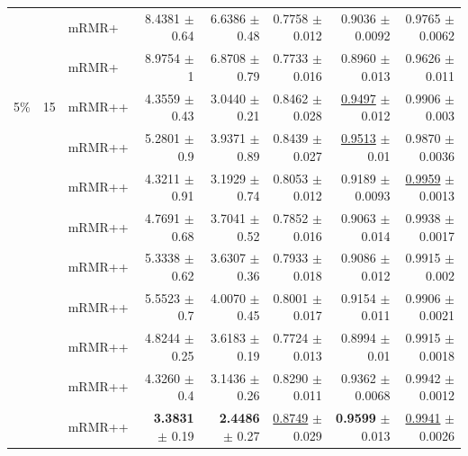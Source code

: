 \begin{longtable}{llp{}rrrrr}
 &  & mRMR+ & 8.4381 {\scriptsize $\pm$ 0.64} & 6.6386 {\scriptsize $\pm$ 0.48} & 0.7758 {\scriptsize $\pm$ 0.012} & 0.9036 {\scriptsize $\pm$ 0.0092} & 0.9765 {\scriptsize $\pm$ 0.0062} \\
 &  & mRMR+ & 8.9754 {\scriptsize $\pm$ 1} & 6.8708 {\scriptsize $\pm$ 0.79} & 0.7733 {\scriptsize $\pm$ 0.016} & 0.8960 {\scriptsize $\pm$ 0.013} & 0.9626 {\scriptsize $\pm$ 0.011} \\
\midrule
5\% & 15 & mRMR++ & 4.3559 {\scriptsize $\pm$ 0.43} & 3.0440 {\scriptsize $\pm$ 0.21} & 0.8462 {\scriptsize $\pm$ 0.028} & \underline{0.9497} {\scriptsize $\pm$ 0.012} & 0.9906 {\scriptsize $\pm$ 0.003} \\
 &  & mRMR++ & 5.2801 {\scriptsize $\pm$ 0.9} & 3.9371 {\scriptsize $\pm$ 0.89} & 0.8439 {\scriptsize $\pm$ 0.027} & \underline{0.9513} {\scriptsize $\pm$ 0.01} & 0.9870 {\scriptsize $\pm$ 0.0036} \\
 &  & mRMR++ & 4.3211 {\scriptsize $\pm$ 0.91} & 3.1929 {\scriptsize $\pm$ 0.74} & 0.8053 {\scriptsize $\pm$ 0.012} & 0.9189 {\scriptsize $\pm$ 0.0093} & \underline{0.9959} {\scriptsize $\pm$ 0.0013} \\
 &  & mRMR++ & 4.7691 {\scriptsize $\pm$ 0.68} & 3.7041 {\scriptsize $\pm$ 0.52} & 0.7852 {\scriptsize $\pm$ 0.016} & 0.9063 {\scriptsize $\pm$ 0.014} & 0.9938 {\scriptsize $\pm$ 0.0017} \\
 &  & mRMR++ & 5.3338 {\scriptsize $\pm$ 0.62} & 3.6307 {\scriptsize $\pm$ 0.36} & 0.7933 {\scriptsize $\pm$ 0.018} & 0.9086 {\scriptsize $\pm$ 0.012} & 0.9915 {\scriptsize $\pm$ 0.002} \\
 &  & mRMR++ & 5.5523 {\scriptsize $\pm$ 0.7} & 4.0070 {\scriptsize $\pm$ 0.45} & 0.8001 {\scriptsize $\pm$ 0.017} & 0.9154 {\scriptsize $\pm$ 0.011} & 0.9906 {\scriptsize $\pm$ 0.0021} \\
 &  & mRMR++ & 4.8244 {\scriptsize $\pm$ 0.25} & 3.6183 {\scriptsize $\pm$ 0.19} & 0.7724 {\scriptsize $\pm$ 0.013} & 0.8994 {\scriptsize $\pm$ 0.01} & 0.9915 {\scriptsize $\pm$ 0.0018} \\
 &  & mRMR++ & 4.3260 {\scriptsize $\pm$ 0.4} & 3.1436 {\scriptsize $\pm$ 0.26} & 0.8290 {\scriptsize $\pm$ 0.011} & 0.9362 {\scriptsize $\pm$ 0.0068} & 0.9942 {\scriptsize $\pm$ 0.0012} \\
 &  & mRMR++ & \textbf{3.3831} {\scriptsize $\pm$ 0.19} & \textbf{2.4486} {\scriptsize $\pm$ 0.27} & \underline{0.8749} {\scriptsize $\pm$ 0.029} & \textbf{0.9599} {\scriptsize $\pm$ 0.013} & \underline{0.9941} {\scriptsize $\pm$ 0.0026} \\

\end{longtable}
